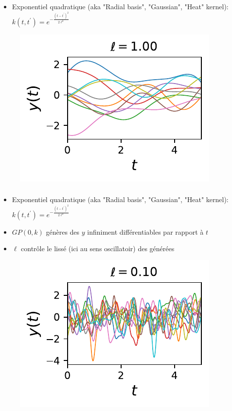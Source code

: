 \documentclass[xcolor=svgnames, t]{beamer}
\begin{document}
\begin{frame}
  \frametitle{\secname}
  \begin{itemize}
    \item Exponentiel quadratique (aka "Radial basis", "Gaussian", "Heat" kernel):
    $k (t, t^\prime) = e^{- \frac{(t - t^\prime)^2}{2 \ell^2} }$
  \end{itemize}
  \begin{figure}
    \includegraphics{10_gp_time_SquaredExponentialKernel_1.00.pdf}
  \end{figure}
\end{frame}

\begin{frame}
  \frametitle{\secname}
  \begin{itemize}
    \item Exponentiel quadratique (aka "Radial basis", "Gaussian", "Heat" kernel):
    $k (t, t^\prime) = e^{- \frac{(t - t^\prime)^2}{2 \ell^2} }$
    \item $GP (0, k)$ génères des $y$ infiniment différentiables par rapport à $t$
    \item \implies $\ell$ contrôle le lissé (ici au sens oscillatoir) des générées
  \end{itemize}
  \begin{figure}
    \includegraphics{10_gp_time_SquaredExponentialKernel_0.10.pdf}
  \end{figure}
\end{frame}
\end{document}
